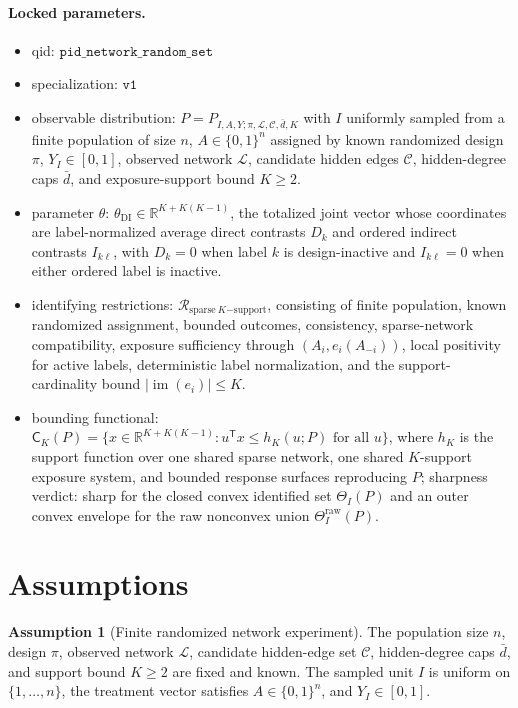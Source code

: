 \documentclass[11pt]{article}
\newcommand{\transpose}{\mathsf{T}}
\theoremstyle{definition}
\newtheorem{assumption}{Assumption}
\theoremstyle{plain}
\theoremstyle{remark}
\begin{document}
\paragraph{Locked parameters.}
\begin{itemize}
  \item qid: \(\texttt{pid\_network\_random\_set}\)
  \item specialization: \(\texttt{v1}\)
  \item observable distribution: \(P=P_{I,A,Y;\pi,\mathcal L,\mathcal C,\bar d,K}\) with \(I\) uniformly sampled from a finite population of size \(n\), \(A\in\{0,1\}^n\) assigned by known randomized design \(\pi\), \(Y_I\in[0,1]\), observed network \(\mathcal L\), candidate hidden edges \(\mathcal C\), hidden-degree caps \(\bar d\), and exposure-support bound \(K\ge2\).
  \item parameter \(\theta\): \(\theta_{\mathrm{DI}}\in\mathbb R^{K+K(K-1)}\), the totalized joint vector whose coordinates are label-normalized average direct contrasts \(D_k\) and ordered indirect contrasts \(I_{k\ell}\), with \(D_k=0\) when label \(k\) is design-inactive and \(I_{k\ell}=0\) when either ordered label is inactive.
  \item identifying restrictions: \(\mathcal R_{\mathrm{sparse}\ K\mathrm{-support}}\), consisting of finite population, known randomized assignment, bounded outcomes, consistency, sparse-network compatibility, exposure sufficiency through \((A_i,e_i(A_{-i}))\), local positivity for active labels, deterministic label normalization, and the support-cardinality bound \(|\operatorname{im}(e_i)|\le K\).
  \item bounding functional: \(\mathsf C_K(P)=\{x\in\mathbb R^{K+K(K-1)}:u^\transpose x\le h_K(u;P)\text{ for all }u\}\), where \(h_K\) is the support function over one shared sparse network, one shared \(K\)-support exposure system, and bounded response surfaces reproducing \(P\); sharpness verdict: sharp for the closed convex identified set \(\Theta_I(P)\) and an outer convex envelope for the raw nonconvex union \(\Theta_I^{\mathrm{raw}}(P)\).
\end{itemize}

\section{Assumptions}
\begin{assumption}[Finite randomized network experiment]\label{ass:finite}
The population size \(n\), design \(\pi\), observed network \(\mathcal L\), candidate hidden-edge set \(\mathcal C\), hidden-degree caps \(\bar d\), and support bound \(K\ge2\) are fixed and known.  The sampled unit \(I\) is uniform on \(\{1,\ldots,n\}\), the treatment vector satisfies \(A\in\{0,1\}^n\), and \(Y_I\in[0,1]\).
\end{assumption}
\end{document}
